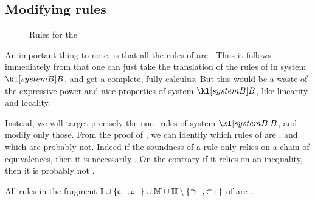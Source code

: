 \subsection{Modifying rules}

\begin{figure*}
  
  \caption{Rules for the   }
\end{figure*}

An important thing to note, is that all the rules of  are
\emph{}. Thus it follows immediately from
 that one can just take the translation of the rules
of  in system $\sysB$, and get a complete, fully 
calculus. But this would be a waste of the expressive power and nice properties
of system $\sysB$, like linearity and locality.

Instead, we will target precisely the non- rules of system $\sysB$,
and modify only those. From the proof of , we
can identify which rules of  are , and which are
probably not. Indeed if the soundness of a rule only relies on a chain of
equivalences, then it is necessarily . On the contrary if it relies on
an inequality, then it is probably not .

\begin{fact}
  All rules in the fragment $\mathbb{I} \cup \{\text{\small$\mathsf{c{-}}$},\text{\small$\mathsf{c{+}}$}\} \cup
    \mathbb{M} \cup \mathbb{H} \setminus \{\text{\small$\mathsf{{\supset}{-}}$},\text{\small$\mathsf{{\subset}{+}}$}\}$ of
   are .
\end{fact}

